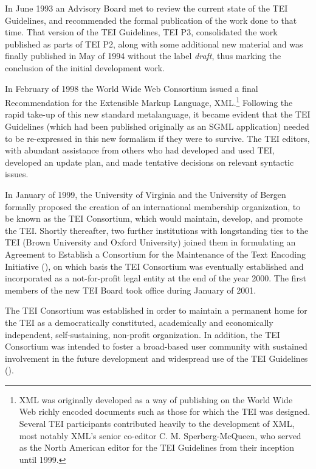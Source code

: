 In June 1993 an Advisory Board met to review the current state of the TEI Guidelines, and recommended the formal publication of the work done to that time. That version of the TEI Guidelines, TEI P3, consolidated the work published as parts of TEI P2, along with some additional new material and was finally published in May of 1994 without the label \textit{draft}, thus marking the conclusion of the initial development work.\par
In February of 1998 the World Wide Web Consortium issued a final Recommendation for the Extensible Markup Language, XML.\footnote{XML was originally developed as a way of publishing on the World Wide Web richly encoded documents such as those for which the TEI was designed. Several TEI participants contributed heavily to the development of XML, most notably XML's senior co-editor C. M. Sperberg-McQueen, who served as the North American editor for the TEI Guidelines from their inception until 1999.} Following the rapid take-up of this new standard metalanguage, it became evident that the TEI Guidelines (which had been published originally as an SGML application) needed to be re-expressed in this new formalism if they were to survive. The TEI editors, with abundant assistance from others who had developed and used TEI, developed an update plan, and made tentative decisions on relevant syntactic issues.\par
In January of 1999, the University of Virginia and the University of Bergen formally proposed the creation of an international membership organization, to be known as the TEI Consortium, which would maintain, develop, and promote the TEI. Shortly thereafter, two further institutions with longstanding ties to the TEI (Brown University and Oxford University) joined them in formulating an Agreement to Establish a Consortium for the Maintenance of the Text Encoding Initiative (\cite{AB-eg-02}), on which basis the TEI Consortium was eventually established and incorporated as a not-for-profit legal entity at the end of the year 2000. The first members of the new TEI Board took office during January of 2001.\par
The TEI Consortium was established in order to maintain a permanent home for the TEI as a democratically constituted, academically and economically independent, self-sustaining, non-profit organization. In addition, the TEI Consortium was intended to foster a broad-based user community with sustained involvement in the future development and widespread use of the TEI Guidelines (\cite{AB-eg-03}).\par
